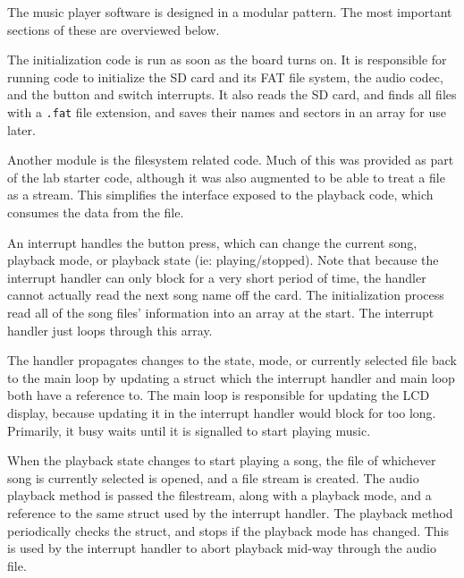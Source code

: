 \documentclass[12pt]{article}
\begin{document}
\doublespacing

The music player software is designed in a modular pattern.
The most important sections of these are overviewed below.

The initialization code is run as soon as the board turns on.
It is responsible for running code to initialize the SD card and its FAT file
system, the audio codec, and the button and switch interrupts.
It also reads the SD card, and finds all files with a \texttt{.fat} file
extension, and saves their names and sectors in an array for use later.

Another module is the filesystem related code.
Much of this was provided as part of the lab starter code, although it was also
augmented to be able to treat a file as a stream.
This simplifies the interface exposed to the playback code, which consumes the
data from the file.

An interrupt handles the button press, which can change the current song,
playback mode, or playback state (ie: playing/stopped).
Note that because the interrupt handler can only block for a very short period
of time, the handler cannot actually read the next song name off the card.
The initialization process read all of the song files' information into an
array at the start.
The interrupt handler just loops through this array.

The handler propagates changes to the state, mode, or currently selected file
back to the main loop by updating a struct which the interrupt handler and main
loop both have a reference to.
The main loop is responsible for updating the LCD display, because updating it
in the interrupt handler would block for too long.
Primarily, it busy waits until it is signalled to start playing music.

When the playback state changes to start playing a song, the file of whichever
song is currently selected is opened, and a file stream is created.
The audio playback method is passed the filestream, along with a playback mode,
and a reference to the same struct used by the interrupt handler.
The playback method periodically checks the struct, and stops if the playback
mode has changed.
This is used by the interrupt handler to abort playback mid-way through the audio
file.
\end{document}
